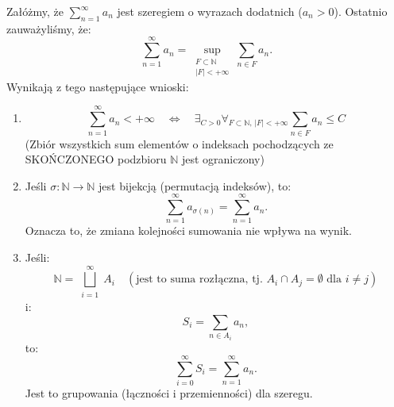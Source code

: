 \documentclass{article}
\numberwithin{defi}{section}
\numberwithin{theo}{section}
\numberwithin{defi}{section}
\newcommand{\N}{\mathbb{N}}
\newcommand{\oo}{\infty}
\begin{document}
Załóżmy, że $\sum_{n=1}^{\infty} a_n$ jest szeregiem o wyrazach dodatnich ($a_n > 0$). Ostatnio zauważyliśmy, że:
\[\sum\limits_{n=1}^{\infty} a_n = \sup_{\substack{F \subset \N \\ |F| < +\infty}} \sum_{n \in F} a_n.\]
Wynikają z tego następujące wnioski:
\begin{twier}{}
    \begin{enumerate}
        \item \[\sum_{n = 1}^{\infty} a_n < + \infty \quad \iff \quad \exists_{C>0} \forall_{F \subset \N ,\, |F| < +\oo}  \sum_{n \in F} a_n \leqslant C\]
              (Zbiór wszystkich sum elementów o indeksach pochodzących ze SKOŃCZONEGO podzbioru $\N$ jest ograniczony)
        \item Jeśli $\sigma : \N \rightarrow \N$ jest bijekcją (permutacją indeksów), to:
              \[\sum_{n=1}^{\oo} a_{\sigma(n)} = \sum_{n=1}^{\oo} a_{n}.\]
              Oznacza to, że zmiana kolejności sumowania nie wpływa na wynik.
        \item Jeśli:
              \[\N = \bigsqcup_{\substack{i=1}}^{\oo} A_i \quad (\text{jest to suma rozłączna, tj. } A_i \cap A_j = \emptyset \text{ dla } i \neq j)\]
              i:
              \[S_i = \sum_{n \in A_i} a_n,\]
              to:
              \[\sum_{i=0}^{\oo}S_i  = \sum_{n=1}^{\oo}a_n.  \]
              Jest to grupowania (łączności i przemienności) dla szeregu.
    \end{enumerate}
\end{twier}
\end{document}
